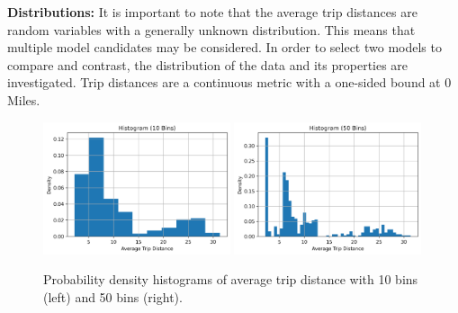 \documentclass[11pt]{article}
\begin{document}
    

\textbf{Distributions:} 
It is important to note that the average trip distances
are random variables with a generally unknown distribution.
This means that multiple model candidates may be considered.
In order to select two models to compare and contrast, the distribution of the data
and its properties are investigated.
Trip distances are a continuous metric with a one-sided bound at 0 Miles.


    \begin{figure}[H]
        \includegraphics[width=0.49\textwidth]{../plots/histogram-Average Trip Distance-10-bins.png}
        \includegraphics[width=0.49\textwidth]{../plots/histogram-Average Trip Distance-50-bins.png}
        \centering
        \caption{Probability density histograms of average trip distance with 10 bins (left) and 50 bins (right).} %
        \label{fig:hists}
    \end{figure}
\end{document}
